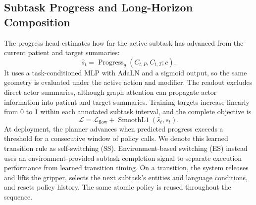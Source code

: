 \subsection{Subtask Progress and Long-Horizon Composition}
The progress head estimates how far the active subtask has advanced from the current patient and target summaries:
\begin{equation}
    \hat{s}_t=\operatorname{Progress}_{\theta}(C_{t,P},C_{t,T};c).
\label{eq:progress}
\end{equation}
It uses a task-conditioned MLP with AdaLN and a sigmoid output, so the same geometry is evaluated under the active action and modifier.
The readout excludes direct actor summaries, although graph attention can propagate actor information into patient and target summaries.
Training targets increase linearly from 0 to 1 within each annotated subtask interval, and the complete objective is
\begin{equation}
    \mathcal{L}=\mathcal{L}_{\mathrm{flow}}+
    \operatorname{SmoothL1}(\hat{s}_t,s_t).
\end{equation}
At deployment, the planner advances when predicted progress exceeds a threshold for a consecutive window of policy calls.
We denote this learned transition rule as self-switching (SS).
Environment-based switching (ES) instead uses an environment-provided subtask completion signal to separate execution performance from learned transition timing.
On a transition, the system releases and lifts the gripper, selects the next subtask's entities and language conditions, and resets policy history.
The same atomic policy is reused throughout the sequence.
